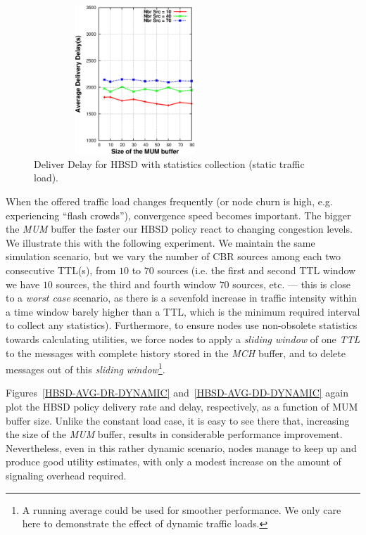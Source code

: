 \begin{figure}[!h]
  \begin{center}
    \includegraphics[width=3in,height=2.2in]{Chapitre3/fig14.eps}
  \end{center}
  \caption{Deliver Delay for HBSD with statistics collection (static traffic load).}
  \label{HBSD-AVG-DD-MUM}
\end{figure}

When the offered traffic load changes frequently (or node churn is high, e.g. experiencing ``flash crowds''), convergence speed becomes important. The bigger the \emph{MUM} buffer the faster our HBSD policy react to changing congestion levels. We illustrate this with the following experiment. We maintain the same simulation scenario, but we vary the number of CBR sources among each two consecutive TTL(s), from $10$ to $70$ sources (i.e. the first and second TTL window we have $10$ sources, the third and fourth window $70$ sources, etc. --- this is close to a \emph{worst case} scenario, as there is a sevenfold increase in traffic intensity within a time window barely higher than a TTL, which is the minimum required interval to collect any statistics). Furthermore, to ensure nodes use non-obsolete statistics towards calculating utilities, we force nodes to apply a \emph{sliding window} of one \emph{TTL} to the messages with complete history stored in the \emph{MCH} buffer, and to delete messages out of this \emph{sliding window}\footnote{A running average could be used for smoother performance. We only care here to demonstrate the effect of dynamic traffic loads.}.

Figures~\ref{HBSD-AVG-DR-DYNAMIC} and~\ref{HBSD-AVG-DD-DYNAMIC} again plot the HBSD policy delivery rate and delay, respectively, as a function of MUM buffer size. Unlike the constant load case, it is easy to see there that, increasing the size of the \emph{MUM} buffer, results in considerable performance improvement. Nevertheless, even in this rather dynamic scenario, nodes manage to keep up and produce good utility estimates, with only a modest increase on the amount of signaling overhead required.

